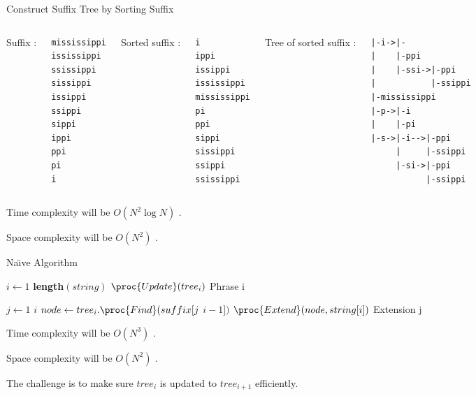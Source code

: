 
\begin{frame}[fragile]{Construct Suffix Tree by Sorting Suffix}

\lstset{basicstyle=\ttfamily}
\begin{columns}
Suffix :
\begin{lstlisting}
mississippi
ississippi
ssissippi
sissippi
issippi
ssippi
sippi
ippi
ppi
pi
i
\end{lstlisting}
Sorted suffix :
\begin{lstlisting}
i
ippi
issippi
ississippi
mississippi
pi
ppi
sippi
sissippi
ssippi
ssissippi
\end{lstlisting}

Tree of sorted suffix :
\lstset{columns=fixed}
\begin{lstlisting}
|-i->|-
|    |-ppi 
|    |-ssi->|-ppi 
|           |-ssippi
|-mississippi 
|-p->|-i 
|    |-pi 
|-s->|-i-->|-ppi
     |     |-ssippi
     |-si->|-ppi
           |-ssippi
\end{lstlisting}
\end{columns}
Time complexity will be $O(N^2 \log N)$ .

Space complexity will be $O(N^2)$ .
\end{frame}


\begin{frame}{Na\"{\i}ve Algorithm }

\begin{codebox}
\li \For $i \gets 1$ \To \textbf{length}$(string)$
\li     \Do $\proc{Update}(tree_i)$ \qquad \Comment Phrase i
        \End
\end{codebox}

\begin{codebox}
\li \For $j \gets 1$ \To $i$
\li     \Do $node \gets  tree_i.\proc{Find}(suffix[j$ \To $i-1])$
\li     $\proc{Extend}(node, string[i])$ \qquad \Comment Extension j
        \End
\end{codebox}

Time complexity will be $O(N^3)$ .

Space complexity will be $O(N^2)$ .

The challenge is to make sure $tree_i$ is updated to 
$tree_{i+1}$ \alert{efficiently}. 
\end{frame}



